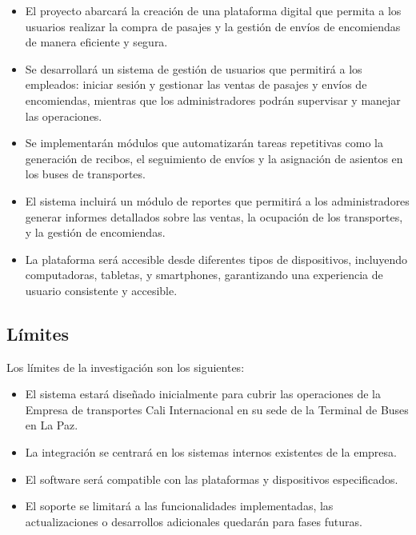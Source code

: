 		\begin{itemize}[label=$\bullet$, left=0cm, labelsep = 1.05cm, topsep = 0pt, parsep = 0pt]
			
			\item El proyecto abarcará la creación de una plataforma digital que permita a los usuarios realizar la compra de pasajes y la gestión de envíos de encomiendas de manera eficiente y segura.
			
			\item Se desarrollará un sistema de gestión de usuarios que permitirá a los empleados: iniciar sesión y gestionar las ventas de pasajes y envíos de encomiendas, mientras que los administradores podrán supervisar y manejar las operaciones.
			
			\item Se implementarán módulos que automatizarán tareas repetitivas como la generación de recibos, el seguimiento de envíos y la asignación de asientos en los buses de transportes.
			
			\item El sistema incluirá un módulo de reportes que permitirá a los administradores generar informes detallados sobre las ventas, la ocupación de los transportes, y la gestión de encomiendas.
			
			\item La plataforma será accesible desde diferentes tipos de dispositivos, incluyendo computadoras, tabletas, y smartphones, garantizando una experiencia de usuario consistente y accesible.
			
		\end{itemize}
		
	\subsection{Límites}
	
		Los límites de la investigación son los siguientes:
		
		\begin{itemize}[label=$\bullet$, left=0cm, labelsep = 1.05cm, topsep = 0pt, parsep = 0pt]
			
			\item El sistema estará diseñado inicialmente para cubrir las operaciones de la Empresa de transportes Cali Internacional en su sede de la Terminal de Buses en La Paz.
			
			\item La integración se centrará en los sistemas internos existentes de la empresa. %
			
			\item El software será compatible con las plataformas y dispositivos especificados. %
			
			\item El soporte se limitará a las funcionalidades implementadas, las actualizaciones o desarrollos adicionales quedarán para fases futuras.
			
		\end{itemize}
		
